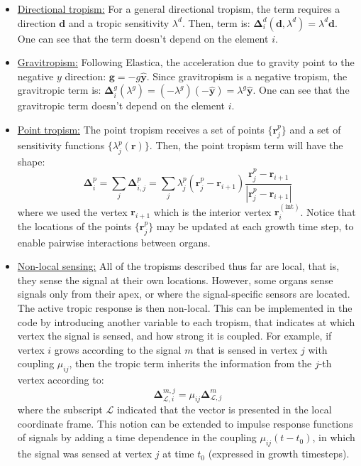 \documentclass[a4paper, 11pt]{article}
\begin{document}
\begin{itemize}
    
    \item \underline{Directional tropism:} For a general directional tropism, the term requires a direction $\boldsymbol{d}$ and a tropic sensitivity $\lambda^d$. Then, term is: $\boldsymbol{\Delta}^d_i(\boldsymbol{d},\lambda^d)=\lambda^d\boldsymbol{d}$. One can see that the term doesn't depend on the element $i$.
    
    \item \underline{Gravitropism:} Following Elastica, the acceleration due to gravity point to the negative $y$ direction: $\boldsymbol{g}=-g\hat{\boldsymbol{y}}$. Since gravitropism is a negative tropism, the gravitropic term is: $\boldsymbol{\Delta}^g_i(\lambda^g)=(-\lambda^g)(-\hat{\boldsymbol{y}})=\lambda^g\hat{\boldsymbol{y}}$. One can see that the gravitropic term doesn't depend on the element $i$.
    
    \item \underline{Point tropism:} The point tropism receives a set of points $\{\boldsymbol{r}^p_j\}$ and a set of sensitivity functions $\{\lambda^p_j(\boldsymbol{r})\}$. Then, the point tropism term will have the shape:
    \begin{equation}
        \boldsymbol{\Delta}^p_{i}=\sum_j\boldsymbol{\Delta}^p_{i,j}=\sum_j\lambda^p_j(\boldsymbol{r}^p_j-\boldsymbol{r}_{i+1})\frac{\boldsymbol{r}^p_j-\boldsymbol{r}_{i+1}}{|\boldsymbol{r}^p_j-\boldsymbol{r}_{i+1}|}
    \end{equation}
    where we used the vertex $\boldsymbol{r}_{i+1}$ which is the interior vertex $\boldsymbol{r}^{(\text{int})}_{i}$. Notice that the locations of the points $\{\boldsymbol{r}^p_j\}$ may be updated at each growth time step, to enable pairwise interactions between organs.
    
    \item \underline{Non-local sensing:} All of the tropisms described thus far are local, that is, they sense the signal at their own locations. However, some organs sense signals only from their apex, or where the signal-specific sensors are located. The active tropic response is then non-local. This can be implemented in the code by introducing another variable to each tropism, that indicates at which vertex the signal is sensed, and how strong it is coupled. For example, if vertex $i$ grows according to the signal $m$ that is sensed in vertex $j$ with coupling $\mu_{ij}$, then the tropic term inherits the information from the $j$-th vertex according to:
    \begin{equation}
        \boldsymbol{\Delta}^{m,j}_{\mathcal{L},i}=\mu_{ij}\boldsymbol{\Delta}^{m}_{\mathcal{L},j}
    \end{equation}
    where the subscript $\mathcal{L}$ indicated that the vector is presented in the local coordinate frame. This notion can be extended to impulse response functions of signals by adding a time dependence in the coupling $\mu_{ij}(t-t_0)$, in which the signal was sensed at vertex $j$ at time $t_0$ (expressed in growth timesteps).
     
\end{itemize}
\end{document}
